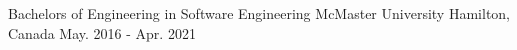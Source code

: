 \begin{cventries}

  \cventry
    {Bachelors of Engineering in Software Engineering } %
    {McMaster University} %
    {Hamilton, Canada} %
    {May. 2016 - Apr. 2021} %
    {}

\end{cventries}
